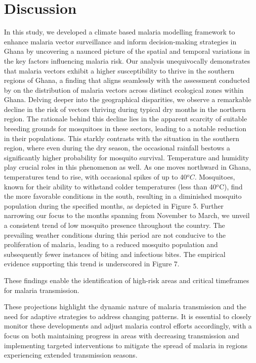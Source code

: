\documentclass[utf8]{FrontiersinHarvard} %
\begin{document}
\section{Discussion}
In this study, we developed a climate based malaria modelling framework to enhance malaria vector surveillance and inform decision-making strategies in Ghana by uncovering a naunced picture of the spatial and temporal variations in the key factors influencing malaria risk. Our analysis unequivocally demonstrates that malaria vectors exhibit a higher susceptibility to thrive in the southern regions of Ghana, a finding that aligns seamlessly with the assessment conducted by \citep{hinne2021larval} on the distribution of malaria vectors across distinct ecological zones within Ghana. Delving deeper into the geographical disparities, we observe a remarkable decline in the risk of vectors thriving during typical dry months in the northern region. The rationale behind this decline lies in the apparent scarcity of suitable breeding grounds for mosquitoes in these sectors, leading to a notable reduction in their populations. This starkly contrasts with the situation in the southern region, where even during the dry season, the occasional rainfall bestows a significantly higher probability for mosquito survival. Temperature and humidity play crucial roles in this phenomenon as well. As one moves northward in Ghana, temperatures tend to rise, with occasional spikes of up to 40$^{o}C$. Mosquitoes, known for their ability to withstand colder temperatures (less than 40$^o$C), find the more favorable conditions in the south, resulting in a diminished mosquito population during the specified months, as depicted in Figure 5. Further narrowing our focus to the months spanning from November to March, we unveil a consistent trend of low mosquito presence throughout the country. The prevailing weather conditions during this period are not conducive to the proliferation of malaria, leading to a reduced mosquito population and subsequently fewer instances of biting and infectious bites. The empirical evidence supporting this trend is underscored in Figure 7.





These findings enable the identification of high-risk areas and critical timeframes for malaria transmission.





These projections highlight the dynamic nature of malaria transmission and the need for adaptive strategies to address changing patterns. It is essential to closely monitor these developments and adjust malaria control efforts accordingly, with a focus on both maintaining progress in areas with decreasing transmission and implementing targeted interventions to mitigate the spread of malaria in regions experiencing extended transmission seasons.
\end{document}
